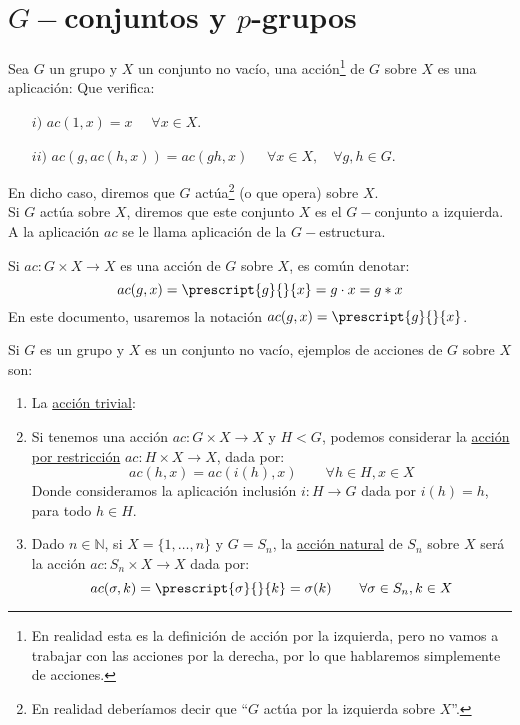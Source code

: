 \chapter{$G-$conjuntos y $p$-grupos}
\begin{definicion}
    Sea $G$ un grupo y $X$ un conjunto no vacío, una acción\footnote{En realidad esta es la definición de acción por la izquierda, pero no vamos a trabajar con las acciones por la derecha, por lo que hablaremos simplemente de acciones.} de $G$ sobre $X$ es una aplicación: 
    Que verifica:
    \begin{enumerate}
        \item[$i)$] $ac(1,x) = x$ $\quad \forall x\in X$.
        \item[$ii)$] $ac(g, ac(h, x)) = ac(gh, x)$ $\quad \forall x\in X, \quad \forall g,h\in G$.
    \end{enumerate}
    En dicho caso, diremos que $G$ actúa\footnote{En realidad deberíamos decir que ``$G$ actúa por la izquierda sobre $X$''.} (o que opera) sobre $X$.\\

    \noindent
    Si $G$ actúa sobre $X$, diremos que este conjunto $X$ es el $G-$conjunto a izquierda. A la aplicación $ac$ se le llama aplicación de la $G-$estructura.
\end{definicion}

\begin{notacion}
    Si $ac:G\times X\to X$ es una acción de $G$ sobre $X$, es común denotar:
    \begin{equation*}
        ac(g,x) = \prescript{g}{}{x} = g\cdot x = g\ast x
    \end{equation*}
    En este documento, usaremos la notación $ac(g,x) = \prescript{g}{}{x}$.
\end{notacion}

\begin{ejemplo}
    Si $G$ es un grupo y $X$ es un conjunto no vacío, ejemplos de acciones de $G$ sobre $X$ son:
    \begin{enumerate}
        \item La \underline{acción trivial}:
        \item Si tenemos una acción $ac:G\times X\to X$ y $H<G$, podemos considerar la \underline{acción por restricción} $ac:H\times X\to X$, dada por:
            \begin{equation*}
                ac(h,x) = ac(i(h),x) \qquad \forall h\in H, x\in X
            \end{equation*}
            Donde consideramos la aplicación inclusión $i:H\to G$ dada por $i(h) = h$, para todo $h\in H$.
        \item Dado $n\in \mathbb{N}$, si $X = \{1,\ldots,n\}$ y $G = S_n$, la \underline{acción natural} de $S_n$ sobre $X$ será la acción $ac:S_n\times X\to X$ dada por:
            \begin{equation*}
                ac(\sigma,k) = \prescript{\sigma}{}{k} = \sigma(k) \qquad \forall \sigma\in S_n, k\in X
            \end{equation*}
    \end{enumerate}
\end{ejemplo}

